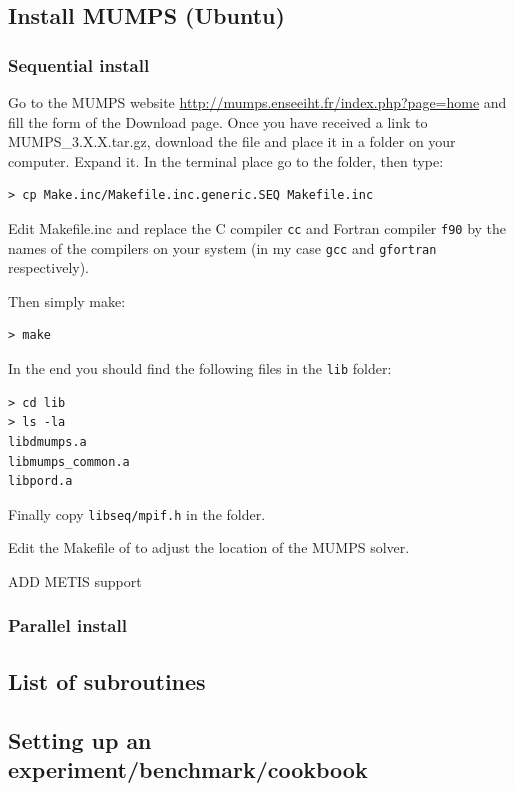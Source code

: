 \subsection{Install MUMPS (Ubuntu)}

\subsubsection{Sequential install}

Go to the MUMPS website \url{http://mumps.enseeiht.fr/index.php?page=home} and 
fill the form of the Download page. 
Once you have received a link to {\filenamefont MUMPS\_3.X.X.tar.gz}, download
the file and place it in a folder on your computer. Expand it. 
In the terminal place go to the folder, then type:
\begin{verbatim}
> cp Make.inc/Makefile.inc.generic.SEQ Makefile.inc
\end{verbatim}
Edit {\filenamefont Makefile.inc} and replace the C compiler {\tt cc} 
and Fortran compiler {\tt f90} by the names of the compilers on 
your system (in my case {\tt gcc} and {\tt gfortran} respectively).

Then simply make:
\begin{verbatim}
> make 
\end{verbatim}
In the end you should find the following files in the {\tt lib} folder:
\begin{verbatim}
> cd lib
> ls -la
libdmumps.a
libmumps_common.a
libpord.a
\end{verbatim}
Finally copy {\tt libseq/mpif.h} in the \elefant folder.

Edit the Makefile of \elefant to adjust the location of the MUMPS solver.

ADD METIS support

\subsubsection{Parallel install}


\subsection{List of subroutines}



\subsection{Setting up an experiment/benchmark/cookbook}

